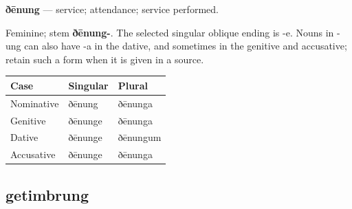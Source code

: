 \par\begin{minipage}{\linewidth}\raggedright
\textbf{ðēnung} — service; attendance; service performed.

Feminine; stem \textbf{ðēnung-}. The selected singular oblique ending is -e. Nouns in -ung can also have -a in the dative, and sometimes in the genitive and accusative; retain such a form when it is given in a source.

\par\begingroup
\fontsize{10.5}{13.2}\selectfont
\setlength{\LTleft}{0pt}\setlength{\LTright}{\fill}
\noindent
\begin{tabular}{@{}>{\raggedright\arraybackslash}p{39.46mm}>{\raggedright\arraybackslash}p{39.46mm}>{\raggedright\arraybackslash}p{39.46mm}@{}}
\toprule
\textbf{Case} & \textbf{Singular} & \textbf{Plural} \\
\midrule
Nominative & ðēnung & ðēnunga \\
Genitive & ðēnunge & ðēnunga \\
Dative & ðēnunge & ðēnungum \\
Accusative & ðēnunge & ðēnunga \\
\bottomrule
\end{tabular}
\par\endgroup

\end{minipage}\par
{}
\subsection*{getimbrung}

